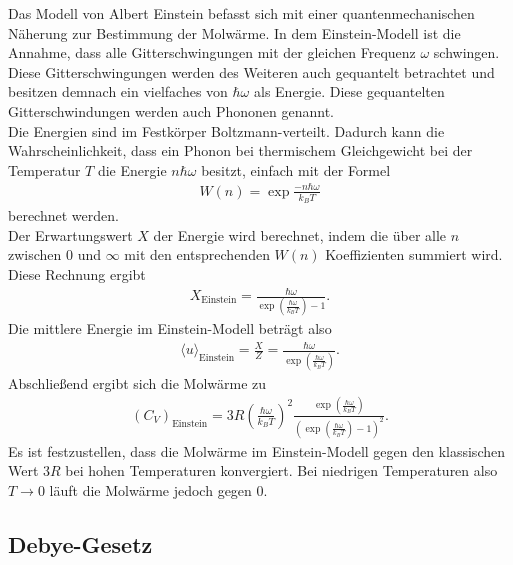 Das Modell von Albert Einstein befasst sich mit einer quantenmechanischen Näherung zur Bestimmung der Molwärme. In dem Einstein-Modell ist die Annahme, 
dass alle Gitterschwingungen mit der gleichen Frequenz $\omega$ schwingen. Diese Gitterschwingungen werden des Weiteren auch gequantelt betrachtet und besitzen demnach ein 
vielfaches von $\hbar \omega$ als Energie. Diese gequantelten Gitterschwindungen werden auch Phononen genannt. \\

Die Energien sind im Festkörper Boltzmann-verteilt. Dadurch kann die Wahrscheinlichkeit, dass ein Phonon bei thermischem Gleichgewicht bei der Temperatur $T$ die Energie $n \hbar \omega$ besitzt, 
einfach mit der Formel
\begin{align}
    \label{eqn:wn}
    W(n) = \exp{\frac{-n \hbar \omega}{k_B T}}
\end{align}
berechnet werden. \\
Der Erwartungswert $X$ der Energie wird berechnet, indem die über alle $n$ zwischen $0$ und $\infty$ mit den entsprechenden $W(n)$ Koeffizienten summiert wird. 
Diese Rechnung ergibt
\begin{align}
    X_{\text{Einstein}} = \frac{\hbar \omega}{\exp \left( \frac{\hbar \omega}{k_B T}\right) -1} .
\end{align} 
Die mittlere Energie im Einstein-Modell beträgt also 
\begin{align}
    \langle u \rangle_{\text{Einstein}} = \frac{X}{Z} = \frac{\hbar \omega }{\exp \left( \frac{\hbar \omega}{k_B T}\right)}.
\end{align}
Abschließend ergibt sich die Molwärme zu 
\begin{align}
    \label{eqn:moleinstein}
    (C_V)_{\text{Einstein}} = 3 R \left( \frac{\hbar \omega}{k_B T}\right)^2 \frac{\exp \left(\frac{\hbar \omega}{k_B T}\right)}{\left(\exp \left(\frac{\hbar \omega}{k_B T}\right) -1 \right)^2}.
\end{align}
Es ist festzustellen, dass die Molwärme im Einstein-Modell gegen den klassischen Wert $3 R$ bei hohen Temperaturen konvergiert. Bei niedrigen Temperaturen also $T \rightarrow 0$ läuft die Molwärme jedoch gegen $0$.
\subsection{Debye-Gesetz}
\label{sec:debye}

